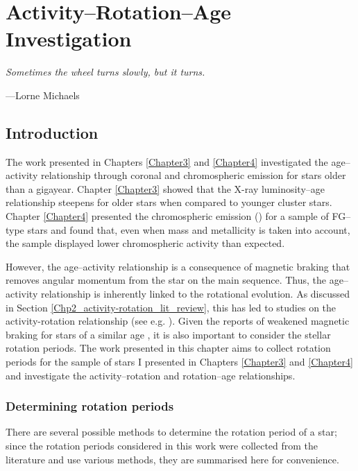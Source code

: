 
\chapter{Activity--Rotation--Age Investigation} %

\label{Chapter5} 

\epigraph{\itshape Sometimes the wheel turns slowly, but it turns.}{---Lorne Michaels}

\section{Introduction}

The work presented in Chapters \ref{Chapter3} and \ref{Chapter4} investigated the age--activity relationship through coronal and chromospheric emission for stars older than a gigayear. Chapter \ref{Chapter3} \citep{Booth_etal_2017} showed that the X-ray luminosity--age relationship steepens for older stars when compared to younger cluster stars. Chapter \ref{Chapter4} presented the chromospheric emission (\Rprime) for a sample of FG--type stars and found that, even when mass and metallicity is taken into account, the sample displayed lower chromospheric activity than expected.

However, the age--activity relationship is a consequence of magnetic braking that removes angular momentum from the star on the main sequence. Thus, the age--activity relationship is inherently linked to the rotational evolution. As discussed in Section \ref{Chp2_activity-rotation_lit_review}, this has led to studies on the activity-rotation relationship (see e.g. \citealt{Pizzolato_etal_2003,Wright_etal_2011}). Given the reports of weakened magnetic braking for stars of a similar age \citep{van_Saders_etal_2016}, it is also important to consider the stellar rotation periods. The work presented in this chapter aims to collect rotation periods for the sample of stars I presented in Chapters \ref{Chapter3} and \ref{Chapter4} and investigate the activity--rotation and rotation--age relationships.

\subsection{Determining rotation periods}
\label{Chp5_Prot_methods}

There are several possible methods to determine the rotation period of a star; since the rotation periods considered in this work were collected from the literature and use various methods, they are summarised here for convenience.

